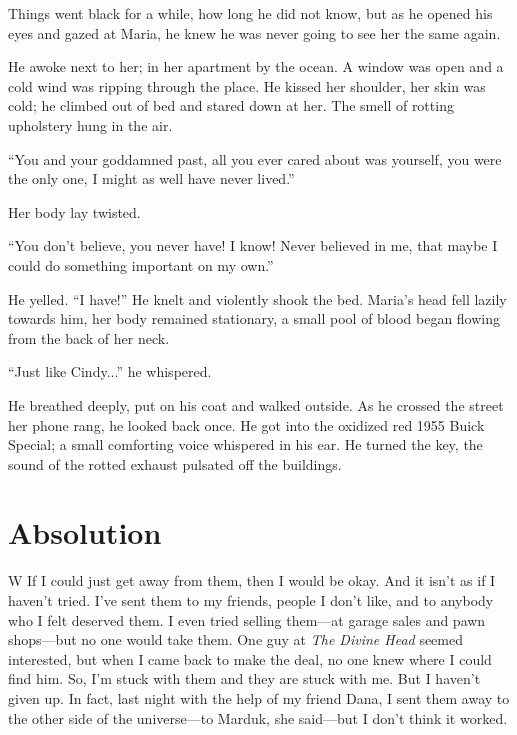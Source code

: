 Things went black for a while, how long he did not know, but as he
opened his eyes and gazed at Maria, he knew he was never going to see
her the same again.

He awoke next to her; in her apartment by the ocean. A window was open
and a cold wind was ripping through the place. He kissed her shoulder,
her skin was cold; he climbed out of bed and stared down at her. The
smell of rotting upholstery hung in the air.

``You and your goddamned past, all you ever cared about was yourself,
you were the only one, I might as well have never lived.''

Her body lay twisted.

``You don't believe, you never have! I know! Never believed in me, that
maybe I could do something important on my own.''

He yelled. ``I have!'' He knelt and violently shook the bed. Maria's
head fell lazily towards him, her body remained stationary, a small pool
of blood began flowing from the back of her neck.

``Just like Cindy...'' he whispered.

He breathed deeply, put on his coat and walked outside. As he crossed
the street her phone rang, he looked back once. He got into the oxidized
red 1955 Buick Special; a small comforting voice whispered in his ear.
He turned the key, the sound of the rotted exhaust pulsated off the
buildings.

\section{Absolution}\label{absolution}

W If I could just get away from them, then I would be okay. And it isn't
as if I haven't tried. I've sent them to my friends, people I don't
like, and to anybody who I felt deserved them. I even tried selling
them---at garage sales and pawn shops---but no one would take them. One
guy at \emph{The Divine Head} seemed interested, but when I came back to
make the deal, no one knew where I could find him. So, I'm stuck with
them and they are stuck with me. But I haven't given up. In fact, last
night with the help of my friend Dana, I sent them away to the other
side of the universe---to Marduk, she said---but I don't think it
worked.

